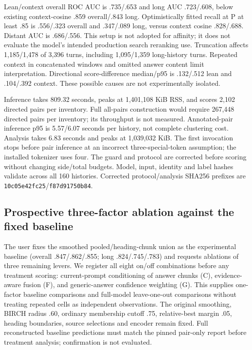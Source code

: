 \documentclass[11pt]{article}
\begin{document}
Lean/context overall ROC AUC is .735/.653 and long AUC .723/.608, below existing
context-cosine .859 overall/.843 long. Optimistically fitted recall at P at
least .85 is .556/.323 overall and .347/.089 long, versus context cosine
.828/.688. Distant AUC is .686/.556. This setup is not adopted for affinity;
it does not evaluate the model's intended production search reranking use.
Truncation affects 1,185/1,478 of 3,396 turns, including 1,095/1,359 long-history
turns. Repeated context in concatenated windows and omitted answer content
limit interpretation. Directional score-difference median/p95 is .132/.512
lean and .104/.392 context. These possible causes are not experimentally isolated.

Inference takes 809.32 seconds, peaks at 1,401,108 KiB RSS, and scores 2,102
directed pairs per inventory. Full all-pairs construction would require 267,448
directed pairs per inventory; its throughput is not measured. Annotated-pair
inference p95 is 5.57/6.07 seconds per history, not complete clustering cost.
Analysis takes 6.83 seconds and peaks at 1,039,032 KiB. The first invocation
stops before pair inference at an incorrect three-special-token assumption;
the installed tokenizer uses four. The guard and protocol are corrected before
scoring without changing side/total budgets. Model, input, identity and label
hashes validate across all 160 histories. Corrected protocol/analysis SHA256
prefixes are \texttt{10c05e42fc25}/\texttt{f87d91750b84}.

\subsection{Prospective three-factor ablation against the fixed baseline}
The user fixes the smoothed pooled/heading-chunk union as the experimental
baseline (overall .847/.862/.855; long .824/.745/.783) and requests ablations
of three remaining levers. We register all eight on/off combinations before
any treatment scoring: current-prompt conditioning of answer chunks (C),
evidence-aware fusion (F), and generic-answer confidence weighting (G).
This supplies one-factor baseline comparisons and full-model leave-one-out
comparisons without treating repeated cells as independent observations.
The original smoothing, BIRCH radius .60, ordinary membership cutoff .75,
relative-best margin .05, heading boundaries, source selections and encoder
remain fixed. Full reconstructed baseline predictions must match the pinned
pair-only report before treatment analysis; confirmation is not evaluated.
\end{document}
